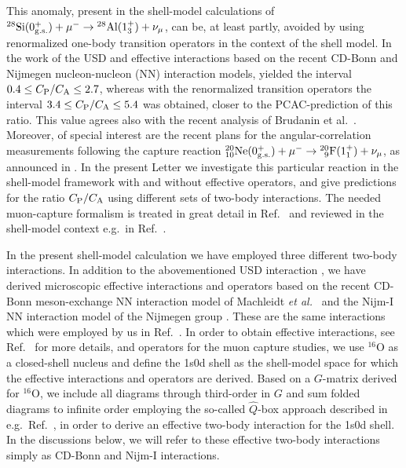 \documentclass[12pt]{iopart}
\begin{document}
This anomaly, present in the shell-model calculations of $^{28}{\rm Si}(0^+
_{\rm g.s.})+\mu^-\to{}^{28}{\rm Al}(1^+_3)+\nu_\mu$,
can be, at least partly, avoided by using renormalized one-body
transition operators in the context of the shell model. In the work of
\cite{sii99} the USD and effective interactions based on the 
recent CD-Bonn \cite{mac96} and 
Nijmegen \cite{nim94} nucleon-nucleon (NN) interaction models, yielded the interval
$0.4\le C_{\rm P}/C_{\rm A}\le 2.7$, whereas with the renormalized transition
operators the interval $3.4\le C_{\rm P}/C_{\rm A}\le 5.4$ was obtained, closer
to the PCAC-prediction of this ratio. 
This value agrees also with the recent analysis of Brudanin et al.\ \cite{bru99}.
Moreover, of special interest are the recent plans for the angular-correlation
measurements following the capture reaction ${}_{10}^{20}{\rm Ne}(0^+_{\rm
g.s.})+\mu^- \to{}_{\phantom{0}9}^{20}{\rm F}(1^+_1)+\nu_\mu$, as  announced
in \cite{bru99}. In
the present Letter we investigate this particular reaction in the shell-model
framework with and without effective operators, and give predictions for
the ratio $C_{\rm P}/C_{\rm A}$ using
different sets of two-body interactions. The needed muon-capture formalism is
treated in great detail in Ref.\ \cite{mor60} and reviewed in the shell-model
context e.g.\ in Ref.\ \cite{sii98}. 

In the present shell-model calculation
we have employed three different two-body interactions.
In addition to the abovementioned USD interaction \cite{wil84}, we have 
derived microscopic effective interactions and operators based on
the recent CD-Bonn meson-exchange NN interaction model  of Machleidt {\em et al.}\
\cite{mac96} and the Nijm-I NN interaction model of the Nijmegen group \cite{nim94}.
These are the same interactions which were 
 employed by us in Ref.\  \cite{sii99}.
In order to obtain effective interactions, see Ref.\ \cite{hko95} for more
details,
and operators for the muon capture studies,
we use $^{16}$O as a closed-shell nucleus and define the 1s0d shell as
the shell-model space for which the effective interactions and operators are
derived. Based on a $G$-matrix derived for  $^{16}$O, we include all diagrams
through third-order in $G$ and sum folded diagrams to infinite order
employing the so-called 
$\hat{Q}$-box approach described in e.g.\ Ref.\ \cite{hko95}, in order
to derive an effective two-body interaction for the 1s0d shell.
In the discussions below, we will refer to these effective two-body
interactions simply as CD-Bonn and Nijm-I interactions.
\end{document}
